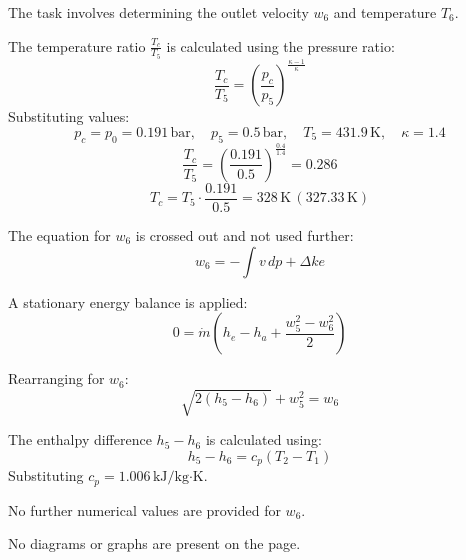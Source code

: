 The task involves determining the outlet velocity \( w_6 \) and temperature \( T_6 \).  

The temperature ratio \( \frac{T_c}{T_5} \) is calculated using the pressure ratio:  
\[
\frac{T_c}{T_5} = \left( \frac{p_c}{p_5} \right)^{\frac{\kappa - 1}{\kappa}}
\]  
Substituting values:  
\[
p_c = p_0 = 0.191 \, \text{bar}, \quad p_5 = 0.5 \, \text{bar}, \quad T_5 = 431.9 \, \text{K}, \quad \kappa = 1.4
\]  
\[
\frac{T_c}{T_5} = \left( \frac{0.191}{0.5} \right)^{\frac{0.4}{1.4}} = 0.286
\]  
\[
T_c = T_5 \cdot \frac{0.191}{0.5} = 328 \, \text{K} \, (327.33 \, \text{K})
\]  

The equation for \( w_6 \) is crossed out and not used further:  
\[
w_6 = - \int v \, dp + \Delta ke
\]  

A stationary energy balance is applied:  
\[
0 = \dot{m} \left( h_e - h_a + \frac{w_5^2 - w_6^2}{2} \right)
\]  

Rearranging for \( w_6 \):  
\[
\sqrt{2(h_5 - h_6)} + w_5^2 = w_6
\]  

The enthalpy difference \( h_5 - h_6 \) is calculated using:  
\[
h_5 - h_6 = c_p (T_2 - T_1)
\]  
Substituting \( c_p = 1.006 \, \text{kJ/kg·K} \).  

No further numerical values are provided for \( w_6 \).  

No diagrams or graphs are present on the page.